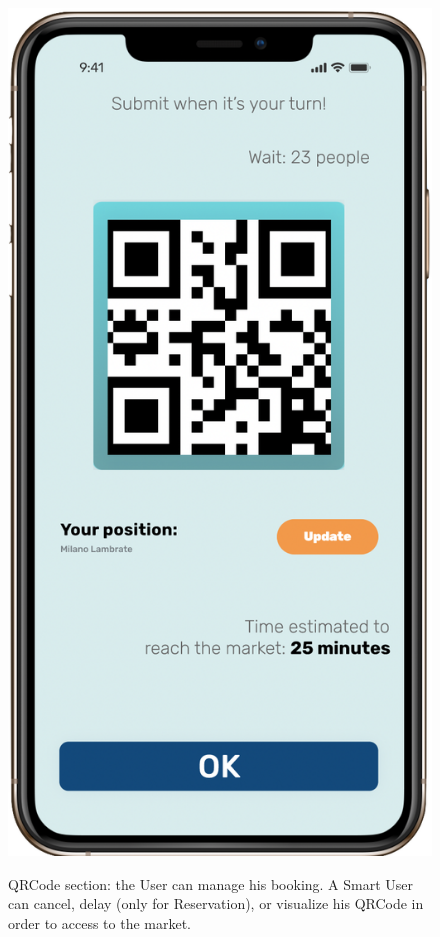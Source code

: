 \begin{figure}[H]
\begin{center}
{            \includegraphics[scale=0.30]{images/mockup/qr_reservation.png}
        }%
%
    \end{center}
    \caption{
        QRCode section: the User can manage his booking. A Smart User can cancel, delay (only for Reservation), or visualize his QRCode in order to access to the market.
     }
   \label{fig:subfigures}
\end{figure}


